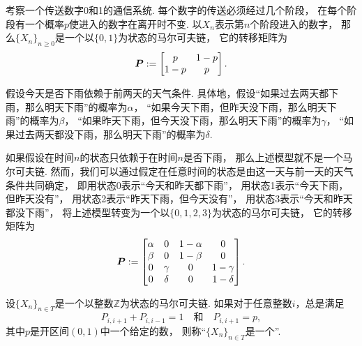 \begin{example}[通信系统]
考察一个传送数字0和1的通信系统.
每个数字的传送必须经过几个阶段，
在每个阶段有一个概率\(p\)使进入的数字在离开时不变.
以\(X_n\)表示第\(n\)个阶段进入的数字，
那么\(\{X_n\}_{n\geq0}\)是一个以\(\{0,1\}\)为状态的马尔可夫链，
它的转移矩阵为\begin{equation*}
	\boldsymbol{P} := \begin{bmatrix}
		p & 1-p \\
		1-p & p
	\end{bmatrix}.
\end{equation*}
\end{example}

\begin{example}[将一个过程转变为马尔可夫链]
假设今天是否下雨依赖于前两天的天气条件.
具体地，假设“如果过去两天都下雨，那么明天下雨”的概率为\(\alpha\)，
“如果今天下雨，但昨天没下雨，那么明天下雨”的概率为\(\beta\)，
“如果昨天下雨，但今天没下雨，那么明天下雨”的概率为\(\gamma\)，
“如果过去两天都没下雨，那么明天下雨”的概率为\(\delta\).

如果假设在时间\(n\)的状态只依赖于在时间\(n\)是否下雨，
那么上述模型就不是一个马尔可夫链.
然而，我们可以通过假定在任意时间的状态是由这一天与前一天的天气条件共同确定，
即用状态0表示“今天和昨天都下雨”，
用状态1表示“今天下雨，但昨天没有”，
用状态2表示“昨天下雨，但今天没有”，
用状态3表示“今天和昨天都没下雨”，
将上述模型转变为一个以\(\{0,1,2,3\}\)为状态的马尔可夫链，
它的转移矩阵为\begin{equation*}
	\boldsymbol{P} := \begin{bmatrix}
		\alpha & 0 & 1-\alpha & 0 \\
		\beta & 0 & 1-\beta & 0 \\
		0 & \gamma & 0 & 1-\gamma \\
		0 & \delta & 0 & 1-\delta
	\end{bmatrix}.
\end{equation*}
\end{example}

\begin{definition}
设\(\{X_n\}_{n \in T}\)是一个以整数\(\mathbb{Z}\)为状态的马尔可夫链.
如果对于任意整数\(i\)，总是满足\begin{equation*}
	P_{i,i+1} + P_{i,i-1} = 1
	\quad\text{和}\quad
	P_{i,i+1} = p,
\end{equation*}
其中\(p\)是开区间\((0,1)\)中一个给定的数，
则称“\(\{X_n\}_{n \in T}\)是一个”.
\end{definition}
